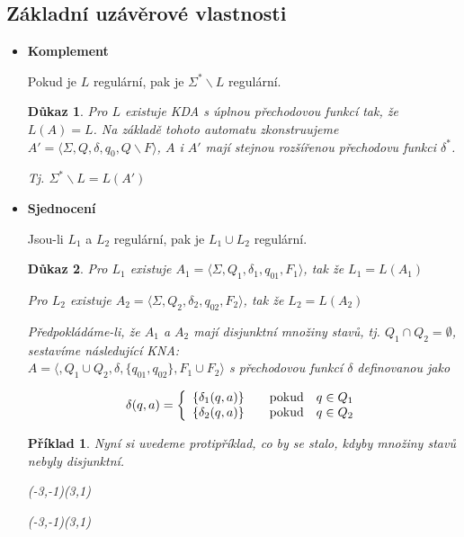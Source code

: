 \documentclass[10pt, a4paper, titlepage]{article}
\theoremstyle{note}
\newtheorem{dukaz}{\textbf{Důkaz}}
\newtheorem{priklad}{\textbf{Příklad}}
\newcommand{\aut}[1]{$A_#1= \langle \Sigma,Q_#1,\delta_#1,q_{0#1},F_#1 \rangle$}
\begin{document}
\subsection{Základní uzávěrové vlastnosti}

\begin{itemize}
\item
\textbf{Komplement}

Pokud je $L$ regulární, pak je $\Sigma^* \backslash L$ regulární.
\begin{dukaz}
Pro $L$ existuje KDA s úplnou přechodovou funkcí tak, že $L(A) = L$. Na základě tohoto automatu zkonstruujeme $A'=\langle \Sigma, Q, \delta,q_0,Q \backslash F \rangle$, $A$ i $A'$ mají stejnou rozšířenou přechodovu funkci $\delta^*$.

Tj. $\Sigma^* \backslash L = L(A')$
\end{dukaz}

\item
\textbf{Sjednocení} 

Jsou-li $L_1$ a $L_2$ regulární, pak je $L_1 \cup L_2$ regulární.

\begin{dukaz}
Pro $L_1$ existuje \aut{1}, tak že $L_1=L(A_1)$

Pro $L_2$ existuje \aut{2}, tak že $L_2=L(A_2)$

Předpokládáme-li, že $A_1$ a $A_2$ mají disjunktní množiny stavů, tj. $Q_1 \cap Q_2 = \emptyset$, sestavíme následující KNA:\\
$A=\langle,Q_1 \cup Q_2,\delta,\lbrace q_{01},q_{02} \rbrace,F_1 \cup F_2 \rangle$ s přechodovou funkcí $\delta$ definovanou jako

$$
\delta(q,a)=\left\{
\begin{array}{l@{\quad\mbox{}\quad}l}
\lbrace \delta_1(q,a) \rbrace & \text{pokud}\quad q \in Q_1\\
\lbrace \delta_2(q,a) \rbrace & \text{pokud}\quad q \in Q_2\\
\end{array}
\right.
$$
\end{dukaz}
\begin{priklad}
Nyní si uvedeme protipříklad, co by se stalo, kdyby množiny stavů nebyly disjunktní.

\begin{center}
\begin{VCPicture}{(-3,-1)(3,1)}
\end{VCPicture}
\end{center}
\begin{center}
\begin{VCPicture}{(-3,-1)(3,1)}
\end{VCPicture}
\end{center}


\end{priklad}
\end{itemize}
\end{document}
